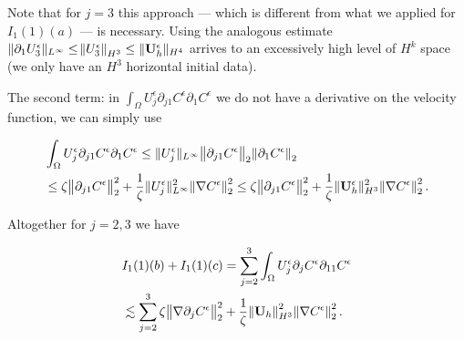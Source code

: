 \documentclass{beamer}
\begin{document}
\begin{frame}

\changefontsizes{11pt}

Note that for $j=3$ this approach --- which is different from what we applied for $I_1(1)(a)$ --- is necessary. Using the analogous estimate $\| \partial_1 U_3^\epsilon \| _ {L^\infty} \leq \norm{U_3^\epsilon}_{H^3} \leq \| \mathbf{U}_h^\epsilon \| _{H^4}$ arrives to an excessively high level of $H^k$ space (we only have an $H^3$ horizontal initial data).

The second term: in $\int_\Omega U_j^\epsilon \partial_{j1} C^\epsilon \partial_1 C^\epsilon$ we do not have a derivative on the velocity function, we can simply use

\begin{equation} \nonumber
  \begin{split}
    & \int_\Omega U_j^\epsilon \partial_{j1} C^\epsilon \partial_1 C^\epsilon \leq \| U_j^\epsilon \| _{L^\infty} \norm{\partial_{j1} C^\epsilon}_2 \norm{\partial_1 C^\epsilon}_2 \\
    &  \leq \zeta \norm{\partial_{j1} C^\epsilon}_2^2 +  \frac{1}{\zeta} \| U_j^\epsilon \| _{L^\infty}^2 \norm{\nabla C^\epsilon}_2^2 \leq \zeta \norm{\partial_{j1} C^\epsilon}_2^2 +  \frac{1}{\zeta} \| \mathbf{U}_h^\epsilon \| _{H^3}^2 \norm{\nabla C^\epsilon}_2^2. 
  \end{split}
\end{equation}

Altogether for $j = 2,3$ we have

\begin{equation} \nonumber
  \begin{split}
    & I_1(1)(b) + I_1(1)(c) = \sum_{j=2}^3 \int_\Omega U_j^\epsilon \partial_j C^\epsilon \partial_{11} C^\epsilon \\
    & \lesssim \sum_{j=2}^3 \zeta \norm{\nabla \partial_j C^\epsilon}_2^2 + \frac{1}{\zeta} \norm{\mathbf{U}_h}_{H^3}^2 \norm{\nabla C^\epsilon}_2^2.
  \end{split}
\end{equation}

\end{frame}
\end{document}
